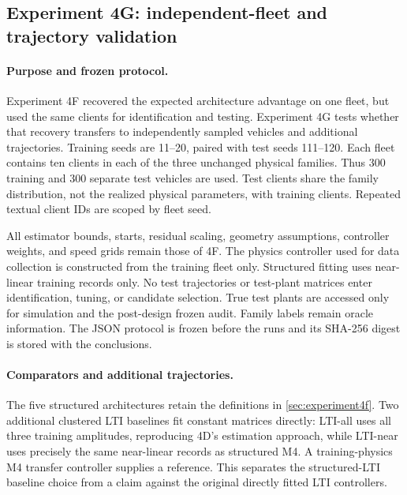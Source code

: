 \subsection{Experiment 4G: independent-fleet and trajectory validation}
\label{sec:experiment4g}
\paragraph{Purpose and frozen protocol.}
Experiment 4F recovered the expected architecture advantage on one fleet, but
used the same clients for identification and testing. Experiment 4G tests whether
that recovery transfers to independently sampled vehicles and additional
trajectories. Training seeds are 11--20, paired with test seeds 111--120. Each
fleet contains ten clients in each of the three unchanged physical families.
Thus 300 training and 300 separate test vehicles are used. Test clients share
the family distribution, not the realized physical parameters, with training
clients. Repeated textual client IDs are scoped by fleet seed.

All estimator bounds, starts, residual scaling, geometry assumptions, controller
weights, and speed grids remain those of 4F. The physics controller used for
data collection is constructed from the training fleet only. Structured fitting
uses near-linear training records only. No test trajectories or test-plant
matrices enter identification, tuning, or candidate selection. True test plants
are accessed only for simulation and the post-design frozen audit. Family labels
remain oracle information. The JSON protocol is frozen before the runs and its
SHA-256 digest is stored with the conclusions.

\paragraph{Comparators and additional trajectories.}
The five structured architectures retain the definitions in
\cref{sec:experiment4f}. Two additional clustered LTI baselines fit constant
matrices directly: LTI-all uses all three training amplitudes, reproducing 4D's
estimation approach, while LTI-near uses precisely the same near-linear records
as structured M4. A training-physics M4 transfer controller supplies a reference.
This separates the structured-LTI baseline choice from a claim against the
original directly fitted LTI controllers.

